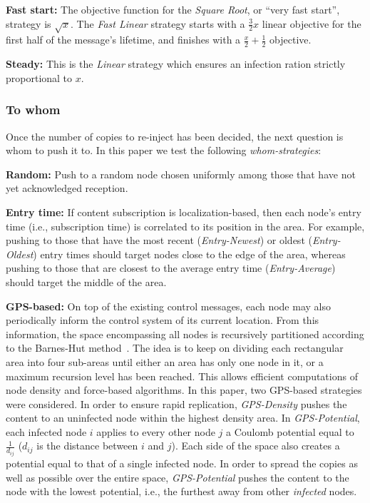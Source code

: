 \documentclass[preprint]{elsarticle}
\begin{document}
\smallskip\noindent\textbf{Fast start:} The objective function for the \textit{Square Root}, or ``very fast start'', strategy is $\sqrt{x}$. The \textit{Fast Linear} strategy starts with a $\frac{3}{2}x$ linear objective for the first half of the message's lifetime, and finishes with a $\frac{x}{2}+\frac{1}{2}$ objective.

\smallskip\noindent\textbf{Steady:} This is the \textit{Linear} strategy which ensures an infection ration strictly proportional to $x$.

\subsubsection{To whom}
\label{subsubsec:whom}

Once the number of copies to re-inject has been decided, the next question is whom to push it to. In this paper we test the following \textit{whom-strategies}:

\smallskip\noindent\textbf{Random:} Push to a random node chosen uniformly among those that have not yet acknowledged reception.

\smallskip\noindent\textbf{Entry time:} If content subscription is localization-based, then each node's entry time (i.e., subscription time) is correlated to its position in the area. For example, pushing to those that have the most recent (\textit{Entry-Newest}) or oldest (\textit{Entry-Oldest}) entry times should target nodes close to the edge of the area, whereas pushing to those that are closest to the average entry time (\textit{Entry-Average}) should target the middle of the area.

\smallskip\noindent\textbf{GPS-based:} On top of the existing control messages, each node may also periodically inform the control system of its current location. From this information, the space encompassing all nodes is recursively partitioned according to the Barnes-Hut method~\cite{barneshut86}. The idea is to keep on dividing each rectangular area into four sub-areas until either an area has only one node in it, or a maximum recursion level has been reached. This allows efficient computations of node density and force-based algorithms. In this paper, two GPS-based strategies were considered. In order to ensure rapid replication, \textit{GPS-Density} pushes the content to an uninfected node within the highest density area. In \textit{GPS-Potential}, each infected node $i$ applies to every other node $j$ a Coulomb potential equal to $\frac{1}{d_{ij}}$ ($d_{ij}$ is the distance between $i$ and $j$). Each side of the space also creates a potential equal to that of a single infected node. In order to spread the copies as well as possible over the entire space, \textit{GPS-Potential} pushes the content to the node with the lowest potential, i.e., the furthest away from other \emph{infected} nodes.
\end{document}
